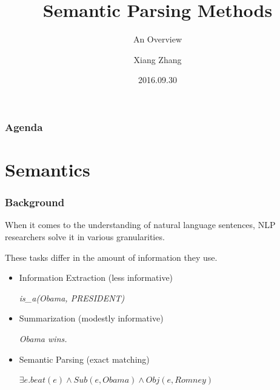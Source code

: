 \documentclass{beamer}
\title[]{Semantic Parsing Methods}
\subtitle{An Overview}
\author {Xiang Zhang}
\date{2016.09.30}
\begin{document}
\frame{\titlepage}

\begin{frame}
\frametitle{Agenda}
\tableofcontents[hideallsubsections]
\end{frame}


\section{Semantics}

\begin{frame}
    \frametitle{Background}

    When it comes to the understanding of natural language sentences, NLP researchers 
    solve it in various granularities.

    These tasks differ in the amount of information they use.

    \begin{itemize}
        \item <1-> Information Extraction (less informative) \\
            \begin{center}
                \emph{is\_a(Obama, PRESIDENT)}
            \end{center}

        \item <2-> Summarization (modestly informative) \\
            \begin{center}
            \emph{Obama wins.}
            \end{center}

        \item <3-> Semantic Parsing (exact matching) \\
            \begin{center}
            $\exists e . beat(e) \wedge Sub(e, Obama) \wedge Obj(e, Romney)$
            \end{center}
            
    \end{itemize}

\end{frame}
\end{document}
